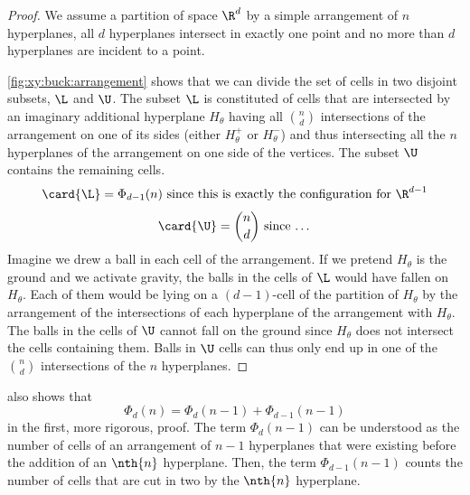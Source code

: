 \begin{proof}
We assume a partition of space \(\R^d\) by a simple arrangement of \(n\)
hyperplanes, \ie all \(d\) hyperplanes intersect in exactly one point and no
more than \(d\) hyperplanes are incident to a point.

\ref{fig:xy:buck:arrangement} shows that we can divide the set of cells in two
disjoint subsets, \(\L\) and \(\U\). The subset \(\L\) is constituted of cells that are
intersected by an imaginary additional hyperplane \(H_{\theta}\) having all
\(\binom{n}{d}\) intersections of the arrangement on one of its sides (either
\(H_{\theta}^{+}\) or \(H_{\theta}^{-}\)) and thus intersecting all the \(n\)
hyperplanes of the arrangement on one side of the vertices. The subset \(\U\) contains the
remaining cells.
\begin{displaymath}
\card{\L} = \Phi_{d-1}(n) \text{ since this is exactly the configuration for } \R^{d-1}
\end{displaymath}
\begin{displaymath}
\card{\U} = \binom{n}{d} \text{ since \dots}
\end{displaymath}
Imagine we drew a ball in each cell of the arrangement. If we pretend
\(H_{\theta}\) is the ground and we activate gravity, the balls in the cells of
\(\L\) would have fallen on \(H_{\theta}\). Each of them would be lying on a
\((d-1)\)-cell of the partition of \(H_{\theta}\) by the arrangement of the
intersections of each hyperplane of the arrangement with \(H_{\theta}\). The
balls in the cells of \(\U\) cannot fall on the ground since \(H_{\theta}\)
does not intersect the cells containing them. Balls in \(\U\) cells can thus
only end up in one of the \(\binom{n}{d}\) intersections of the \(n\)
hyperplanes.
\end{proof}

\citet*{matousek:2002} also shows that
\begin{displaymath}
\Phi_d(n) = \Phi_d(n-1) + \Phi_{d-1}(n-1)
\end{displaymath}
in the first, more rigorous, proof. The term \(\Phi_d(n-1)\) can be understood as the
number of cells of an arrangement of \(n-1\) hyperplanes that were existing
before the addition of an \(\nth{n}\) hyperplane. Then, the term \(\Phi_{d-1}(n-1)\)
counts the number of cells that are cut in two by the \(\nth{n}\) hyperplane.
